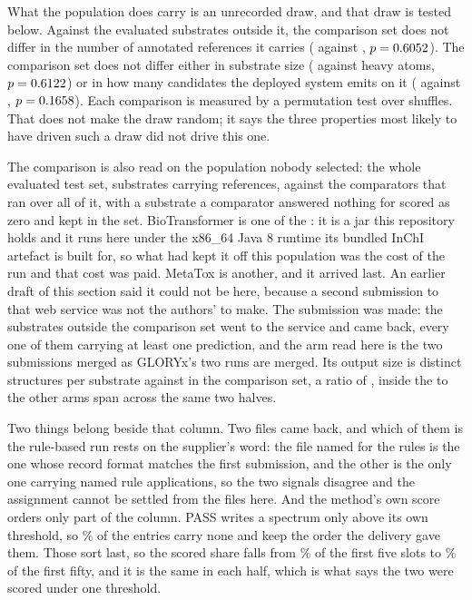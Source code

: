 \documentclass[journal=jcisd8,manuscript=suppinfo,layout=onecolumn]{achemso}
\begin{document}
What the population does carry is an unrecorded draw, and that draw is tested below.
Against the \numPopdefOutside{} evaluated substrates outside it, the comparison set does not
differ in the number of annotated references it carries
(\numPopdefRefsin{} against \numPopdefRefsout{}, $p=0.6052$). The comparison set does
not differ either in substrate size (\numPopdefHeavyin{} against \numPopdefHeavyout{} heavy
atoms, $p=0.6122$) or in how many candidates the deployed system emits on it
(\numPopdefOutputin{} against \numPopdefOutputout{}, $p=0.1658$). Each comparison is
measured by a permutation test over \numPopdefPermutations{} shuffles. That does not make the draw random; it says the three
properties most likely to have driven such a draw did not drive this one.

The comparison is also read on the population nobody selected: the whole evaluated test set,
\numPopdefWholesubstrates{} substrates carrying \numPopdefWholereferences{} references, against
the \numPopdefWholearmsWord{} comparators that ran over all of it, with a substrate a comparator
answered nothing for scored as zero and kept in the set. BioTransformer is one of the \numPopdefWholearmsWord{}: it
is a jar this repository holds and it runs here under the x86\_64 Java 8 runtime its bundled
InChI artefact is built for, so what had kept it off this population was the cost of the run and
that cost was paid. MetaTox is another, and it arrived last. An earlier draft of this section said
it could not be here, because a second submission to that web service was not the authors' to make.
The submission was made: the \numPopdefMetatoxoutsubmitted{} substrates outside the comparison set
went to the service and came back, every one of them carrying at least one prediction, and the arm
read here is the two submissions merged as GLORYx's two runs are merged. Its output size is
\numPopdefMetatoxoutdeliveryrate{} distinct structures per substrate against
\numPopdefMetatoxoutcomprate{} in the comparison set, a ratio of \numPopdefMetatoxoutratio{}, inside
the \numPopdefMetatoxoutpeerlo{} to \numPopdefMetatoxoutpeerhi{} the other
\numPopdefMetatoxoutpeerarmsWord{} arms span across the same two halves.

Two things belong beside that column. Two files came back, and which of them is the rule-based run
rests on the supplier's word: the file named for the rules is the one whose record format matches
the first submission, and the other is the only one carrying named rule applications, so the two
signals disagree and the assignment cannot be settled from the files here. And the method's own
score orders only part of the column. PASS writes a spectrum only above its own threshold, so
\numPopdefMetatoxscoredshare{}\% of the entries carry none and keep the order the delivery gave
them. Those sort last, so the scored share falls from \numPopdefMetatoxscoredfive{}\% of the first
five slots to \numPopdefMetatoxscoredfivezero{}\% of the first fifty, and it is the same in each
half, which is what says the two were scored under one threshold.
\end{document}
